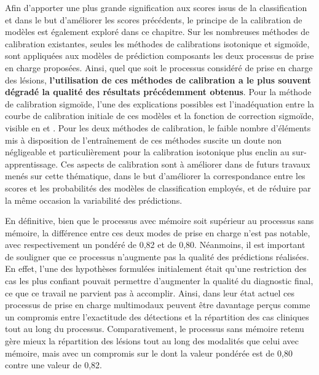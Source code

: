 Afin d'apporter une plus grande signification aux scores issus de la classification et dans le but d'améliorer les scores précédents, le principe de la calibration de modèles est également exploré dans ce chapitre. Sur les nombreuses méthodes de calibration existantes, seules les méthodes de calibrations isotonique et sigmoïde, sont appliquées aux modèles de prédiction composants les deux processus de prise en charge proposées. Ainsi, quel que soit le processus considéré de prise en charge des lésions, \textbf{l'utilisation de ces méthodes de calibration a le plus souvent dégradé la qualité des résultats précédemment obtenus}. Pour la méthode de calibration sigmoïde, l'une des explications possibles est l'inadéquation entre la courbe de calibration initiale de ces modèles et la fonction de correction sigmoïde, visible en  et . Pour les deux méthodes de calibration, le faible nombre d'éléments mis à disposition de l'entraînement de ces méthodes suscite un doute non négligeable et particulièrement pour la calibration isotonique plus enclin au sur-apprentissage. Ces aspects de calibration sont à améliorer dans de futurs travaux menés sur cette thématique, dans le but d'améliorer la correspondance entre les scores et les probabilités des modèles de classification employés, et de réduire par la même occasion la variabilité des prédictions.\par

En définitive, bien que le processus avec mémoire soit supérieur au processus sans mémoire, la différence entre ces deux modes de prise en charge n'est pas notable, avec respectivement un \fscore{} pondéré de 0,82 et de 0,80. Néanmoins, il est important de souligner que ce processus n'augmente pas la qualité des prédictions réalisées. En effet, l'une des hypothèses formulées initialement était qu'une restriction des cas les plus confiant pouvait permettre d'augmenter la qualité du diagnostic final, ce que ce travail ne parvient pas à accomplir. Ainsi, dans leur état actuel ces processus de prise en charge multimodaux peuvent être davantage perçus comme un compromis entre l'exactitude des détections et la répartition des cas cliniques tout au long du processus. Comparativement, le processus sans mémoire retenu gère mieux la répartition des lésions tout au long des modalités que celui avec mémoire, mais avec un compromis sur le \fscore{} dont la valeur pondérée est de 0,80 contre une valeur de 0,82.\par


